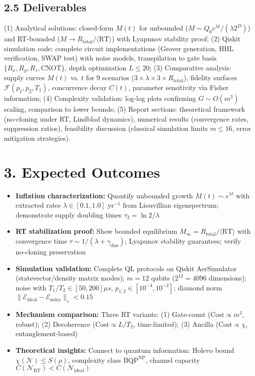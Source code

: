\documentclass[a4paper,10pt,twoside]{article}
\begin{document}
\vspace{-4pt}
\subsection*{2.5 Deliverables}
\vspace{-4pt}

(1) Analytical solutions: closed-form $M(t)$ for unbounded ($M \sim Q_0 e^{\lambda t}/(\lambda 2^D)$) and RT-bounded ($M \to R_{\text{total}}/\langle\text{RT}\rangle$) with Lyapunov stability proof; (2) Qiskit simulation code: complete circuit implementations (Grover generation, HHL verification, SWAP test) with noise models, transpilation to gate basis $\{R_x, R_y, R_z, \text{CNOT}\}$, depth optimization $L \leq 20$; (3) Comparative analysis: supply curves $M(t)$ vs. $t$ for 9 scenarios ($3\times\lambda \times 3\times R_{\text{total}}$), fidelity surfaces $\mathcal{F}(p_1, p_2, T_1)$, concurrence decay $C(t)$, parameter sensitivity via Fisher information; (4) Complexity validation: log-log plots confirming $G \sim O(m^3)$ scaling, comparison to lower bounds; (5) Report sections: theoretical framework (no-cloning under RT, Lindblad dynamics), numerical results (convergence rates, suppression ratios), feasibility discussion (classical simulation limits $m \leq 16$, error mitigation strategies).

\vspace{-4pt}
\section*{3. Expected Outcomes}
\vspace{-4pt}

\begin{itemize}
    \item \textbf{Inflation characterization:} Quantify unbounded growth $M(t) \sim e^{\lambda t}$ with extracted rates $\lambda \in [0.1, 1.0]$ yr$^{-1}$ from Liouvillian eigenspectrum; demonstrate supply doubling times $\tau_2 = \ln 2/\lambda$
    \item \textbf{RT stabilization proof:} Show bounded equilibrium $M_{\infty} = R_{\text{total}}/\langle\text{RT}\rangle$ with convergence time $\tau \sim 1/(\lambda + \gamma_{\text{diss}})$; Lyapunov stability guarantees; verify no-cloning preservation
    \item \textbf{Simulation validation:} Complete QL protocols on Qiskit AerSimulator (statevector/density matrix modes); $m=12$ qubits ($2^{12}=4096$ dimensions); noise with $T_1/T_2 \in [50, 200]\mu s$, $p_{1,2} \in [10^{-4}, 10^{-2}]$; diamond norm $\|\mathcal{E}_{\text{ideal}} - \mathcal{E}_{\text{noisy}}\|_\diamond < 0.15$
    \item \textbf{Mechanism comparison:} Three RT variants: (1) Gate-count ($\text{Cost} \propto m^3$, robust); (2) Decoherence ($\text{Cost} \propto L/T_2$, time-limited); (3) Ancilla ($\text{Cost} \propto \chi$, entanglement-based)
    \item \textbf{Theoretical insights:} Connect to quantum information: Holevo bound $\chi(\mathcal{N}) \leq S(\rho)$, complexity class $\text{BQP}^{\text{NP}}$, channel capacity $C(\mathcal{N}_{\text{RT}}) < C(\mathcal{N}_{\text{ideal}})$
\end{itemize}
\end{document}
